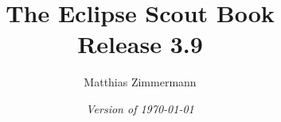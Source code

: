 
\author{Matthias Zimmermann}
\title{\Huge\bf The Eclipse Scout Book\\Release 3.9}
\ifpdf
  \isodate
\fi
\date{\emph{Version of \today}}
\maketitle

